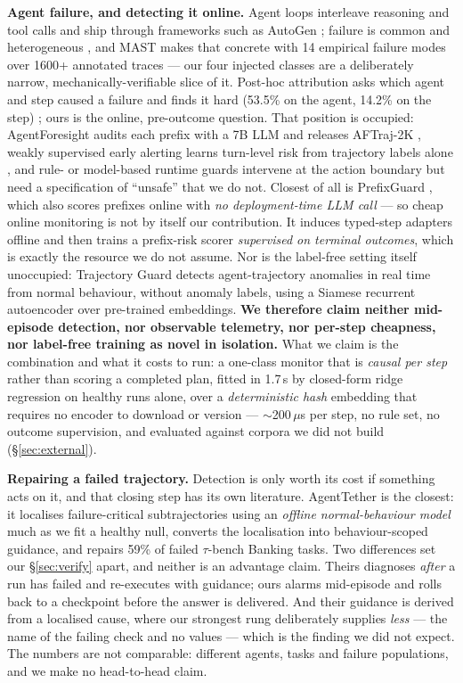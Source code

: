 \documentclass{article}
\begin{document}
\textbf{Agent failure, and detecting it online.} Agent loops interleave reasoning and tool calls \cite{yao2023react} and ship through frameworks such as AutoGen \cite{wu2023autogen}; failure is common and heterogeneous \cite{liu2024agentbench}, and MAST makes that concrete with 14 empirical failure modes over 1600+ annotated traces \cite{cemri2025why} --- our four injected classes are a deliberately narrow, mechanically-verifiable slice of it. Post-hoc attribution asks which agent and step caused a failure and finds it hard (53.5\% on the agent, 14.2\% on the step) \cite{zhang2025which}; ours is the online, pre-outcome question. That position is occupied: AgentForesight audits each prefix with a 7B LLM and releases AFTraj-2K \cite{zhang2026agentforesight}, weakly supervised early alerting learns turn-level risk from trajectory labels alone \cite{baidya2026sparse}, and rule- or model-based runtime guards \cite{wang2025agentspec,wang2025probguard} intervene at the action boundary but need a specification of ``unsafe'' that we do not. Closest of all is PrefixGuard \cite{huang2026prefixguard}, which also scores prefixes online with \emph{no deployment-time LLM call} --- so cheap online monitoring is not by itself our contribution. It induces typed-step adapters offline and then trains a prefix-risk scorer \emph{supervised on terminal outcomes}, which is exactly the resource we do not assume. Nor is the label-free setting itself unoccupied: Trajectory Guard \cite{advani2026trajectoryguard} detects agent-trajectory anomalies in real time from normal behaviour, without anomaly labels, using a Siamese recurrent autoencoder over pre-trained embeddings. \textbf{We therefore claim neither mid-episode detection, nor observable telemetry, nor per-step cheapness, nor label-free training as novel in isolation.} What we claim is the combination and what it costs to run: a one-class monitor that is \emph{causal per step} rather than scoring a completed plan, fitted in 1.7\,s by closed-form ridge regression on healthy runs alone, over a \emph{deterministic hash} embedding that requires no encoder to download or version --- $\sim$200\,$\mu$s per step, no rule set, no outcome supervision, and evaluated against corpora we did not build (\S\ref{sec:external}).

\textbf{Repairing a failed trajectory.} Detection is only worth its cost if something acts on it, and that closing step has its own literature. AgentTether \cite{zhao2026agenttether} is the closest: it localises failure-critical subtrajectories using an \emph{offline normal-behaviour model} much as we fit a healthy null, converts the localisation into behaviour-scoped guidance, and repairs 59\% of failed $\tau$-bench Banking tasks. Two differences set our \S\ref{sec:verify} apart, and neither is an advantage claim. Theirs diagnoses \emph{after} a run has failed and re-executes with guidance; ours alarms mid-episode and rolls back to a checkpoint before the answer is delivered. And their guidance is derived from a localised cause, where our strongest rung deliberately supplies \emph{less} --- the name of the failing check and no values --- which is the finding we did not expect. The numbers are not comparable: different agents, tasks and failure populations, and we make no head-to-head claim.
\end{document}
